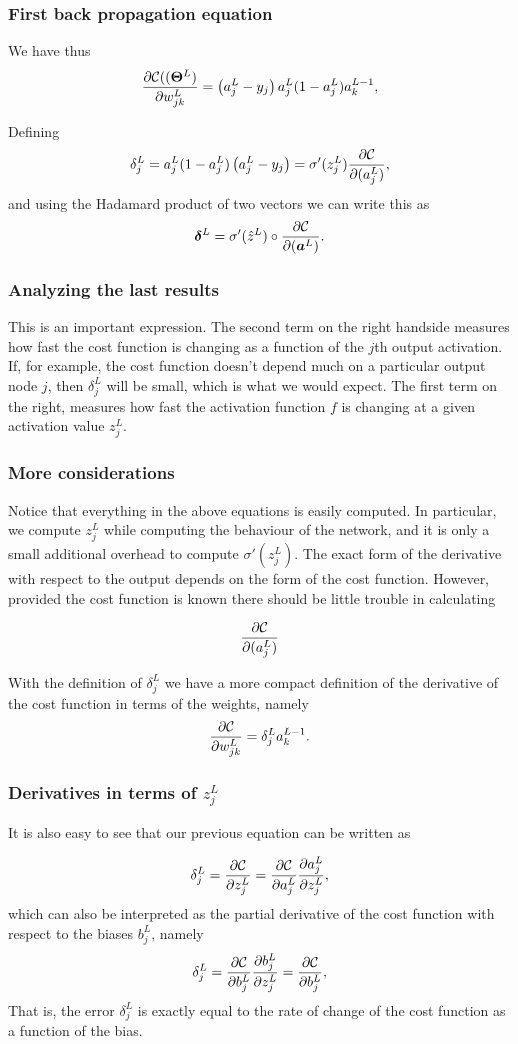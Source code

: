 \documentclass{beamer}
\begin{document}
\begin{frame}
\frametitle{First back propagation equation}

We have thus
\[
\frac{\partial{\cal C}((\bm{\Theta}^L)}{\partial w_{jk}^L}  =  \left(a_j^L - y_j\right)a_j^L(1-a_j^L)a_k^{L-1}, 
\]

Defining
\[
\delta_j^L = a_j^L(1-a_j^L)\left(a_j^L - y_j\right) = \sigma'(z_j^L)\frac{\partial {\cal C}}{\partial (a_j^L)},
\]
and using the Hadamard product of two vectors we can write this as
\[
\bm{\delta}^L = \sigma'(\hat{z}^L)\circ\frac{\partial {\cal C}}{\partial (\bm{a}^L)}.
\]
\end{frame}

\begin{frame}
\frametitle{Analyzing the last results}

This is an important expression. The second term on the right handside
measures how fast the cost function is changing as a function of the $j$th
output activation.  If, for example, the cost function doesn't depend
much on a particular output node $j$, then $\delta_j^L$ will be small,
which is what we would expect. The first term on the right, measures
how fast the activation function $f$ is changing at a given activation
value $z_j^L$.
\end{frame}

\begin{frame}
\frametitle{More considerations}

Notice that everything in the above equations is easily computed.  In
particular, we compute $z_j^L$ while computing the behaviour of the
network, and it is only a small additional overhead to compute
$\sigma'(z^L_j)$.  The exact form of the derivative with respect to the
output depends on the form of the cost function.
However, provided the cost function is known there should be little
trouble in calculating

\[
\frac{\partial {\cal C}}{\partial (a_j^L)}
\]

With the definition of $\delta_j^L$ we have a more compact definition of the derivative of the cost function in terms of the weights, namely
\[
\frac{\partial{\cal C}}{\partial w_{jk}^L}  =  \delta_j^La_k^{L-1}.
\]
\end{frame}

\begin{frame}
\frametitle{Derivatives in terms of $z_j^L$}

It is also easy to see that our previous equation can be written as

\[
\delta_j^L =\frac{\partial {\cal C}}{\partial z_j^L}= \frac{\partial {\cal C}}{\partial a_j^L}\frac{\partial a_j^L}{\partial z_j^L},
\]
which can also be interpreted as the partial derivative of the cost function with respect to the biases $b_j^L$, namely
\[
\delta_j^L = \frac{\partial {\cal C}}{\partial b_j^L}\frac{\partial b_j^L}{\partial z_j^L}=\frac{\partial {\cal C}}{\partial b_j^L},
\]
That is, the error $\delta_j^L$ is exactly equal to the rate of change of the cost function as a function of the bias.
\end{frame}
\end{document}
